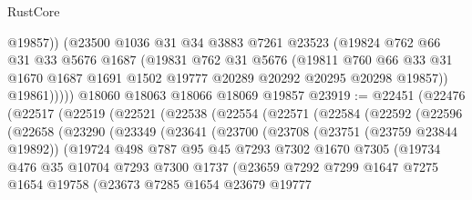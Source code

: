 \begin{lexlean}{RustCore}
\begin{coremodule}
              @19857))
          (@23500
            @1036
            @31
            @34
            @3883
            @7261
            @23523
            (@19824
              @762
              @66
              @31
              @33
              @5676
              @1687
              (@19831
                @762
                @31
                @5676
                (@19811
                  @760
                  @66
                  @33
                  @31
                  @1670
                  @1687
                  @1691
                  @1502
                  @19777
                  @20289
                  @20292
                  @20295
                  @20298
                  @19857))
              @19861)))))
    @18060
    @18063
    @18066
    @18069
    @19857
@23919 := @22451
    (@22476
      (@22517
        (@22519
          (@22521
            (@22538
              (@22554
                (@22571
                  (@22584
                    (@22592
                      (@22596
                        (@22658
                          (@23290
                            (@23349
                              (@23641
                                (@23700
                                  (@23708
                                    (@23751 (@23759 @23844 @19892))
                                    (@19724
                                      @498
                                      @787
                                      @95
                                      @45
                                      @7293
                                      @7302
                                      @1670
                                      @7305
                                      (@19734
                                        @476
                                        @35
                                        @10704
                                        @7293
                                        @7300
                                        @1737
                                        (@23659
                                          @7292
                                          @7299
                                          @1647
                                          @7275
                                          @1654
                                          @19758
                                          (@23673
                                            @7285
                                            @1654
                                            @23679
                                            @19777

\end{coremodule}
\end{lexlean}
